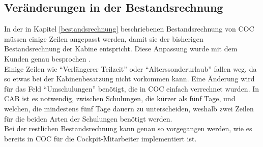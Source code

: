 \documentclass [12pt, a4paper, oneside, titlepage, ngerman]{article}
\begin{document}
\subsection{Veränderungen in der Bestandsrechnung} %
In der in Kapitel \ref{bestandsrechnung} beschriebenen Bestandsrechnung von \ac{COC} müssen einige Zeilen angepasst werden, damit sie der bisherigen Bestandsrechnung der Kabine entspricht. Diese Anpassung wurde mit dem Kunden genau besprochen \cite[vgl.][]{bestanddet}. \\
Einige Zeilen wie "`Verlängerer Teilzeit"' oder "`Alterssonderurlaub"' fallen weg, da so etwas bei der Kabinenbesatzung nicht vorkommen kann. Eine Änderung wird für das Feld "`Umschulungen"' benötigt, die in \ac{COC} einfach verrechnet wurden. In \ac{CAB} ist es notwendig, zwischen Schulungen, die kürzer als fünf Tage, und welchen, die mindestens fünf Tage dauern zu unterscheiden, weshalb zwei Zeilen für die beiden Arten der Schulungen benötigt werden. \\ %
Bei der restlichen Bestandsrechnung kann genau so vorgegangen werden, wie es bereits in \ac{COC} für die Cockpit-Mitarbeiter implementiert ist.

\end{document}
